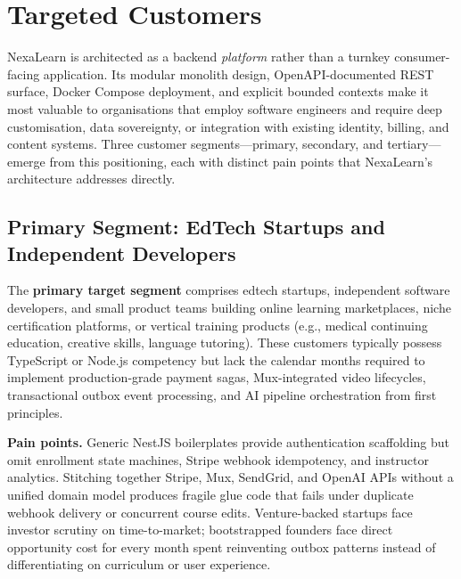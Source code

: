 
\section{Targeted Customers}
\label{sec:targeted-customers}

NexaLearn is architected as a backend \textit{platform} rather than a turnkey consumer-facing application. Its modular monolith design, OpenAPI-documented REST surface, Docker Compose deployment, and explicit bounded contexts make it most valuable to organisations that employ software engineers and require deep customisation, data sovereignty, or integration with existing identity, billing, and content systems. Three customer segments---primary, secondary, and tertiary---emerge from this positioning, each with distinct pain points that NexaLearn's architecture addresses directly.

\subsection{Primary Segment: EdTech Startups and Independent Developers}
\label{subsec:primary-edtech}

The \textbf{primary target segment} comprises edtech startups, independent software developers, and small product teams building online learning marketplaces, niche certification platforms, or vertical training products (e.g., medical continuing education, creative skills, language tutoring). These customers typically possess TypeScript or Node.js competency but lack the calendar months required to implement production-grade payment sagas, Mux-integrated video lifecycles, transactional outbox event processing, and AI pipeline orchestration from first principles.

\textbf{Pain points.} Generic NestJS boilerplates provide authentication scaffolding but omit enrollment state machines, Stripe webhook idempotency, and instructor analytics. Stitching together Stripe, Mux, SendGrid, and OpenAI APIs without a unified domain model produces fragile glue code that fails under duplicate webhook delivery or concurrent course edits. Venture-backed startups face investor scrutiny on time-to-market; bootstrapped founders face direct opportunity cost for every month spent reinventing outbox patterns instead of differentiating on curriculum or user experience.

